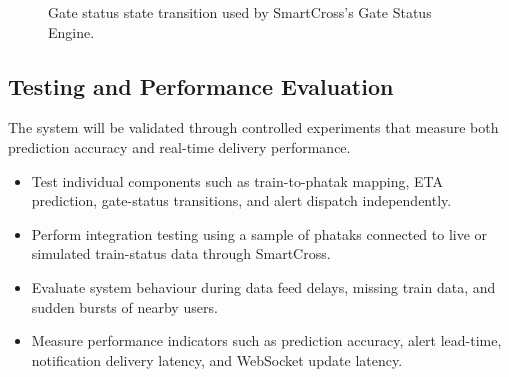 \documentclass[11pt,a4paper]{article}
\begin{document}
\begin{figure}[ht]
\centering


\caption{Gate status state transition used by SmartCross's Gate Status Engine.}

\label{fig:gate_status_state}

\end{figure}

\subsection{Testing and Performance Evaluation}

The system will be validated through controlled experiments that measure both prediction accuracy and real-time delivery performance.

\begin{itemize}
    \item Test individual components such as train-to-phatak mapping, ETA prediction, gate-status transitions, and alert dispatch independently.

    \item Perform integration testing using a sample of phataks connected to live or simulated train-status data through SmartCross.

    \item Evaluate system behaviour during data feed delays, missing train data, and sudden bursts of nearby users.

    \item Measure performance indicators such as prediction accuracy, alert lead-time, notification delivery latency, and WebSocket update latency.
\end{itemize}
\end{document}
